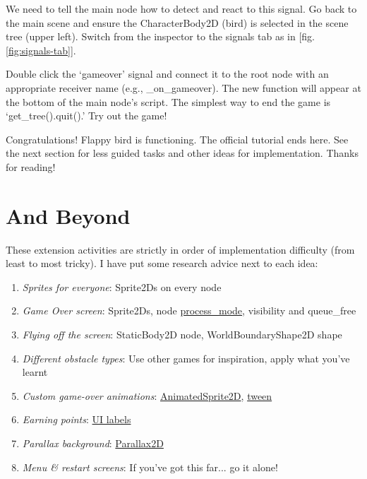 \documentclass[14pt]{extarticle}
\newcommand{\prettyref}[2]{[{#1}.\ref{#2}]}
\begin{document}
We need to tell the main node how to detect and react to this signal. Go back to the main scene and ensure the CharacterBody2D (bird) is selected in the scene tree (upper left). Switch from the inspector to the signals tab as in \prettyref{fig}{fig:signals-tab}.


Double click the `gameover' signal and connect it to the root node with an appropriate receiver name (e.g., \_on\_gameover). The new function will appear at the bottom of the main node's script. The simplest way to end the game is `get\_tree().quit().' Try out the game!

Congratulations! Flappy bird is functioning. The official tutorial ends here. See the next section for less guided tasks and other ideas for implementation. Thanks for reading!

\clearpage
\section{And Beyond}
These extension activities are strictly in order of implementation difficulty (from least to most tricky). I have put some research advice next to each idea:

\begin{enumerate}
  \item \emph{Sprites for everyone}: Sprite2Ds on every node
  \item \emph{Game Over screen}: Sprite2Ds, node \href{https://docs.godotengine.org/en/latest/tutorials/scripting/pausing_games.html}{process\_mode}, visibility and queue\_free
  \item \emph{Flying off the screen}: StaticBody2D node, WorldBoundaryShape2D shape
  \item \emph{Different obstacle types}: Use other games for inspiration, apply what you've learnt
  \item \emph{Custom game-over animations}: \href{https://docs.godotengine.org/en/stable/tutorials/2d/2d_sprite_animation.html}{AnimatedSprite2D}, \href{https://docs.godotengine.org/en/stable/classes/class_tween.html}{tween}
  \item \emph{Earning points}: \href{https://docs.godotengine.org/en/stable/tutorials/ui/index.html}{UI labels}
  \item \emph{Parallax background}: \href{https://docs.godotengine.org/en/stable/tutorials/2d/2d_parallax.html}{Parallax2D}
  \item \emph{Menu \& restart screens}: If you've got this far... go it alone!
\end{enumerate}

\clearpage


\end{document}
